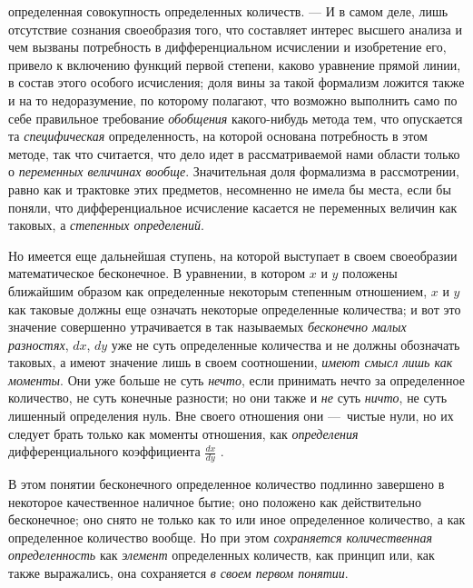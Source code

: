 определенная совокупность определенных количеств. — И в самом деле, лишь
отсутствие сознания своеобразия того, что составляет интерес высшего
анализа и чем вызваны потребность в дифференциальном исчислении и
изобретение его, привело к включению функций первой степени, каково
уравнение прямой линии, в состав этого особого исчисления; доля вины за
такой формализм ложится также и на то недоразумение, по которому полагают,
что возможно выполнить само по себе правильное требование
{\em обобщения} какого-нибудь метода тем, что
опускается та {\em специфическая} определенность, на
которой основана потребность в этом методе, так что считается, что дело
идет в рассматриваемой нами области только о
{\em переменных величинах вообще}. Значительная доля
формализма в рассмотрении, равно как и трактовке этих предметов, несомненно
не имела бы места, если бы поняли, что дифференциальное исчисление касается
не переменных величин как таковых, а {\em степенных
определений}.

Но имеется еще дальнейшая ступень, на которой выступает в своем своеобразии
математическое бесконечное. В уравнении, в котором
$x$ и $y$ положены
ближайшим образом как определенные некоторым степенным отношением,
$x$ и $y$ как таковые
должны еще означать некоторые определенные количества; и вот это значение
совершенно утрачивается в так называемых
{\em бесконечно малых разностях},
$dx$, $dy$ уже не суть
определенные количества и не должны обозначать таковых, а имеют значение
лишь в своем соотношении, {\em имеют смысл лишь как
моменты}. Они уже больше не суть {\em нечто}, если
принимать нечто за определенное количество, не суть конечные разности; но
они также и {\em не} суть
{\em ничто}, не суть лишенный определения нуль. Вне
своего отношения они —~чистые нули, но их следует брать только как моменты
отношения, как {\em определения} дифференциального
коэффициента  $\frac{\mathit{dx}}{\mathit{dy}}$ .

В этом понятии бесконечного определенное количество подлинно завершено в
некоторое качественное наличное бытие; оно положено как действительно
бесконечное; оно снято не только как то или иное определенное количество, а
как определенное количество вообще. Но при этом
{\em сохраняется количественная определенность} как
{\em элемент} определенных количеств, как принцип или,
как также выражались, она сохраняется {\em в своем
первом понятии}.

